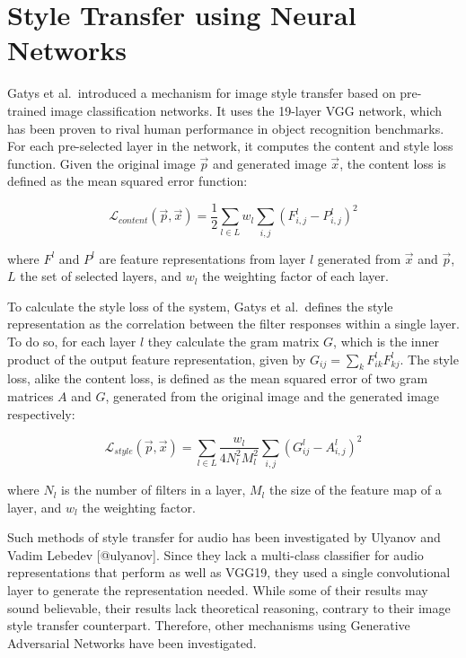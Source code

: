\documentclass[12pt,a4paper,]{report}
\begin{document}
\hypertarget{style-transfer-using-neural-networks}{%
\section{Style Transfer using Neural
Networks}\label{style-transfer-using-neural-networks}}

Gatys et al.~introduced a mechanism for image style transfer based on
pre-trained image classification networks. It uses the 19-layer VGG
network, which has been proven to rival human performance in object
recognition benchmarks. For each pre-selected layer in the network, it
computes the content and style loss function. Given the original image
\(\vec{p}\) and generated image \(\vec{x}\), the content loss is defined
as the mean squared error function:

\begin{equation}
    \mathcal{L}_{content}(\vec{p}, \vec{x}) = \frac{1}{2} \sum_{l \in L} w_l \sum_{i,j} (F^l_{i, j} - P^l_{i, j})^2
\end{equation}

where \(F^l\) and \(P^l\) are feature representations from layer \(l\)
generated from \(\vec{x}\) and \(\vec{p}\), \(L\) the set of selected
layers, and \(w_l\) the weighting factor of each layer.

To calculate the style loss of the system, Gatys et al.~defines the
style representation as the correlation between the filter responses
within a single layer. To do so, for each layer \(l\) they calculate the
gram matrix \(G\), which is the inner product of the output feature
representation, given by \(G_{ij} = \sum_{k} F^l_{ik} F^l_{kj}\). The
style loss, alike the content loss, is defined as the mean squared error
of two gram matrices \(A\) and \(G\), generated from the original image
and the generated image respectively:

\begin{equation}
    \mathcal{L}_{style}(\vec{p}, \vec{x}) =  \sum_{l \in L} \frac{w_l}{4 N_l^2 M_l^2} \sum_{i, j} (G^l_{ij} - A^l_{i, j})^2
\end{equation}

where \(N_l\) is the number of filters in a layer, \(M_l\) the size of
the feature map of a layer, and \(w_l\) the weighting factor.

Such methods of style transfer for audio has been investigated by
Ulyanov and Vadim Lebedev {[}@ulyanov{]}. Since they lack a multi-class
classifier for audio representations that perform as well as VGG19, they
used a single convolutional layer to generate the representation needed.
While some of their results may sound believable, their results lack
theoretical reasoning, contrary to their image style transfer
counterpart. Therefore, other mechanisms using Generative Adversarial
Networks have been investigated.
\end{document}
